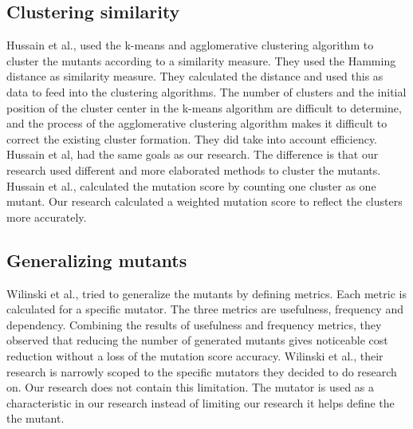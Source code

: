 \documentclass[../main]{subfiles}
\begin{document}
\subsection{Clustering similarity}
Hussain et al., used the k-means and agglomerative clustering algorithm to cluster the mutants according to a similarity measure. 
They used the Hamming distance as similarity measure.
They calculated the distance and used this as data to feed into the clustering algorithms.
The number of clusters and the initial position of the cluster center in the k-means algorithm are difficult to determine, and the process of the agglomerative clustering algorithm makes it difficult to correct the existing cluster formation\cite{Hussain2008}.
They did take into account efficiency.
Hussain et al, had the same goals as our research. 
The difference is that our research used different and more elaborated methods to cluster the mutants.
Hussain et al., calculated the mutation score by counting one cluster as one mutant.
Our research calculated a weighted mutation score to reflect the clusters more accurately.

\subsection{Generalizing mutants}
Wilinski et al., tried to generalize the mutants by defining metrics.
Each metric is calculated for a specific mutator.
The three metrics are usefulness, frequency and dependency.
Combining the results of usefulness and frequency metrics, they observed that reducing the number of generated mutants gives noticeable cost reduction without a loss of the mutation score accuracy.
Wilinski et al., their research is narrowly scoped to the specific mutators they decided to do research on.
Our research does not contain this limitation.
The mutator is used as a characteristic in our research instead of limiting our research it helps define the the mutant.
\end{document}
